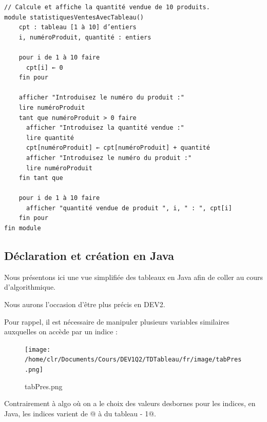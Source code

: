 \documentclass[11pt,a4paper]{article}
\begin{document}
            \par
        \begin{verbatim}
// Calcule et affiche la quantité vendue de 10 produits.
module statistiquesVentesAvecTableau()
    cpt : tableau [1 à 10] d’entiers
    i, numéroProduit, quantité : entiers
    
    pour i de 1 à 10 faire
      cpt[i] ← 0
    fin pour
    
    afficher "Introduisez le numéro du produit :"
    lire numéroProduit
    tant que numéroProduit > 0 faire
      afficher "Introduisez la quantité vendue :"
      lire quantité
      cpt[numéroProduit] ← cpt[numéroProduit] + quantité
      afficher "Introduisez le numéro du produit :"
      lire numéroProduit
    fin tant que
    
    pour i de 1 à 10 faire
      afficher "quantité vendue de produit ", i, " : ", cpt[i]
    fin pour
fin module
      \end{verbatim}\subsection{D\'eclaration et cr\'eation en Java}
		    Nous pr\'esentons ici une vue simplifi\'ee  des tableaux en Java afin de coller
        au cours d'algorithmique.
      
            \par
        
        Nous aurons l'occasion d'\^etre plus pr\'ecis en DEV2.
      
            \par
        
        Pour rappel, il est n\'ecessaire de manipuler plusieurs variables similaires
        auxquelles on acc\`ede par un indice :
      
            \par
        \begin{figure}[hbt]
				    \begin{center}
					\texttt{[image: /home/clr/Documents/Cours/DEV1Q2/TDTableau/fr/image/tabPres.png]}
						\end{center}
                
                    \caption[tabPres.png]{tabPres.png}
                \end{figure}
                    
            \par
        
        Contrairement \`a algo o\`u on a le choix des valeurs desbornes pour les indices, 
        en Java, les indices varient de @ \`a \verb@taille du tableau - 1@.
      
\end{document}
